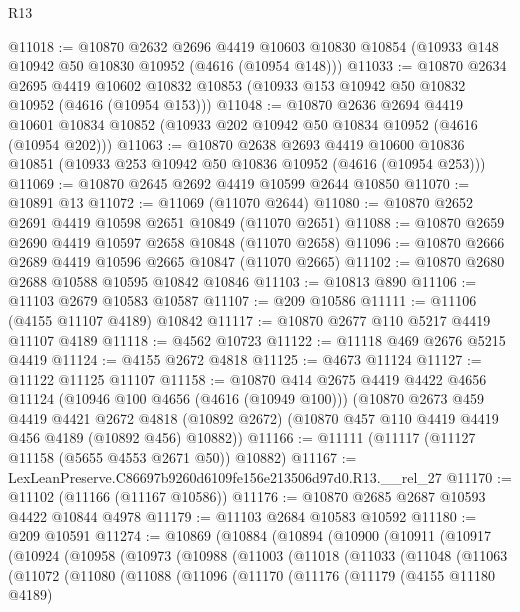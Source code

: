 \begin{lexlean}{R13}
\begin{coremodule}
@11018 := @10870
    @2632
    @2696
    @4419
    @10603
    @10830
    @10854
    (@10933 @148 @10942 @50 @10830 @10952 (@4616 (@10954 @148)))
@11033 := @10870
    @2634
    @2695
    @4419
    @10602
    @10832
    @10853
    (@10933 @153 @10942 @50 @10832 @10952 (@4616 (@10954 @153)))
@11048 := @10870
    @2636
    @2694
    @4419
    @10601
    @10834
    @10852
    (@10933 @202 @10942 @50 @10834 @10952 (@4616 (@10954 @202)))
@11063 := @10870
    @2638
    @2693
    @4419
    @10600
    @10836
    @10851
    (@10933 @253 @10942 @50 @10836 @10952 (@4616 (@10954 @253)))
@11069 := @10870 @2645 @2692 @4419 @10599 @2644 @10850
@11070 := @10891 @13
@11072 := @11069 (@11070 @2644)
@11080 := @10870 @2652 @2691 @4419 @10598 @2651 @10849 (@11070 @2651)
@11088 := @10870 @2659 @2690 @4419 @10597 @2658 @10848 (@11070 @2658)
@11096 := @10870 @2666 @2689 @4419 @10596 @2665 @10847 (@11070 @2665)
@11102 := @10870 @2680 @2688 @10588 @10595 @10842 @10846
@11103 := @10813 @890
@11106 := @11103 @2679 @10583 @10587
@11107 := @209 @10586
@11111 := @11106 (@4155 @11107 @4189) @10842
@11117 := @10870 @2677 @110 @5217 @4419 @11107 @4189
@11118 := @4562 @10723
@11122 := @11118 @469 @2676 @5215 @4419
@11124 := @4155 @2672 @4818
@11125 := @4673 @11124
@11127 := @11122 @11125 @11107
@11158 := @10870
    @414
    @2675
    @4419
    @4422
    @4656
    @11124
    (@10946 @100 @4656 (@4616 (@10949 @100)))
    (@10870
      @2673
      @459
      @4419
      @4421
      @2672
      @4818
      (@10892 @2672)
      (@10870 @457 @110 @4419 @4419 @456 @4189 (@10892 @456) @10882))
@11166 := @11111 (@11117 (@11127 @11158 (@5655 @4553 @2671 @50)) @10882)
@11167 := LexLeanPreserve.C86697b9260d6109fe156e213506d97d0.R13.__rel_27
@11170 := @11102 (@11166 (@11167 @10586))
@11176 := @10870 @2685 @2687 @10593 @4422 @10844 @4978
@11179 := @11103 @2684 @10583 @10592
@11180 := @209 @10591
@11274 := @10869
    (@10884
      (@10894
        (@10900
          (@10911
            (@10917
              (@10924
                (@10958
                  (@10973
                    (@10988
                      (@11003
                        (@11018
                          (@11033
                            (@11048
                              (@11063
                                (@11072
                                  (@11080
                                    (@11088
                                      (@11096
                                        (@11170
                                          (@11176
                                            (@11179
                                              (@4155 @11180 @4189)

\end{coremodule}
\end{lexlean}
